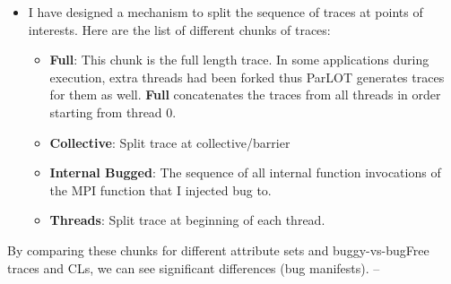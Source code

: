 {\begin{itemize}
\begin{itemize}
	\end{itemize}
\item I have designed a mechanism to split the sequence of traces at points of interests. Here are the list of different chunks of traces:
	\begin{itemize}
	\item \textbf{Full}: This chunk is the full length trace. In some applications during execution, extra threads had been forked thus ParLOT generates traces for them as well. \textbf{Full} concatenates the traces from all threads in order starting from thread 0.
	\item \textbf{Collective}: Split trace at collective/barrier
	\item \textbf{Internal Bugged}: The sequence of all internal function invocations of the MPI function that I injected bug to.
	\item \textbf{Threads}: Split trace at beginning of each thread.
	\end{itemize}
\end{itemize}
By comparing these chunks for different attribute sets and buggy-vs-bugFree traces and CLs, we can see significant differences (bug manifests).
--}